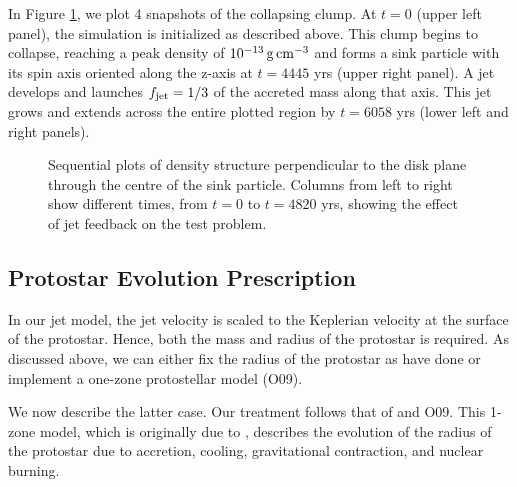 \documentclass[../dissertation.tex]{subfiles}
\begin{document}
In Figure \ref{fig:jet_test_jet}, we plot 4 snapshots of the collapsing clump.
At $t=0$ (upper left panel), the simulation is initialized as described above.
This clump begins to collapse, reaching a peak density of $10^{-13}\,{\rm g\,cm}^{-3}$ and forms a sink particle with its spin axis oriented along the z-axis at $t= 4445$ yrs (upper right panel).
A jet develops and launches $f_{\rm jet} = 1/3$ of the accreted mass along that axis.
This jet grows and extends across the entire plotted region by $t=6058$ yrs (lower left and right panels).

\begin{figure}[htb] %
  \caption[Jet Test Problem]{Sequential plots of density structure perpendicular to the disk plane through the centre of the sink particle. Columns from left to right show different times, from $t=0$ to $t=4820$ yrs, showing the effect of jet feedback on the test problem.}
    \label{fig:jet_test_jet}
\end{figure}


\subsection{Protostar Evolution Prescription}\label{sec:jet_protostar evolution}

In our jet model, the jet velocity is scaled to the Keplerian velocity at the surface of the protostar.
Hence, both the mass and radius of the protostar is required.  As discussed above, we can either fix the radius of the protostar as \citet{2014ApJ...790..128F} have done or implement a one-zone protostellar model (O09).

We now describe the latter case. Our treatment follows that of \citet{2014MNRAS.439.3420M} and O09. %
This 1-zone model, which is originally due to \citet{2000ApJ...534..976N}, describes the evolution of the radius of the protostar due to accretion, cooling, gravitational contraction, and nuclear burning.

\end{document}
